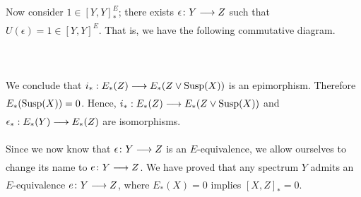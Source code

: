 \documentclass[../main]{subfiles}
\begin{document}
Now consider $1 \in \left[Y,Y\right]^E_{\ast}$; there exists $\epsilon\colon Y  \lar{} Z $ such that $U(\epsilon) = 1 \in \left[Y,Y\right]^E $. That is, we have the following commutative diagram.
~\\~\\
~\\~\\
We conclude that $i_{\ast}: E_{\ast}(Z) \lar{} E_{\ast}(Z \vee \te{Susp}(X))$ is an epimorphism.
Therefore $E_{\ast}(\mathrm{Susp}(X))=0$. Hence, $i_{\ast}: E_{\ast}(Z) \lar{} E_{\ast}(Z \vee \te{Susp}(X))$ and $\epsilon_{\ast}: E_{\ast}(Y) \lar{} E_{\ast}(Z)$ are isomorphisms.

Since we now know that $\epsilon\colon Y \lar{} Z$ is an $E$-equivalence, we allow ourselves to change its name to $e\colon Y \lar{} Z$. We have proved that any spectrum $Y$ admits an $E$-equivalence $e\colon Y \lar{} Z$, where $E_{\ast}(X)=0$ implies $\left[X,Z\right]_{\ast}=0$.
\end{document}
